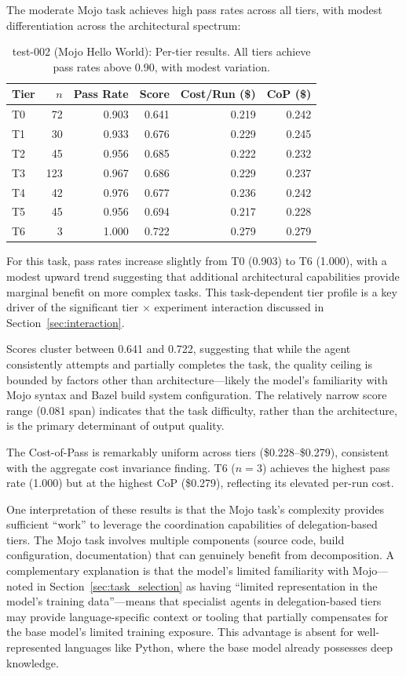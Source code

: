 \documentclass[11pt]{article}
\begin{document}
The moderate Mojo task achieves high pass rates across all tiers, with
modest differentiation across the architectural spectrum:

\begin{table}[htbp]
  \centering
  \caption{test-002 (Mojo Hello World): Per-tier results. All tiers achieve
    pass rates above 0.90, with modest variation.}
  \label{tab:test002}
  \small
  \begin{tabular}{lrrrrr}
    \toprule
    Tier & $n$ & Pass Rate & Score & Cost/Run (\$) & CoP (\$) \\
    \midrule
    T0 & 72  & 0.903 & 0.641 & 0.219 & 0.242 \\
    T1 & 30  & 0.933 & 0.676 & 0.229 & 0.245 \\
    T2 & 45  & 0.956 & 0.685 & 0.222 & 0.232 \\
    T3 & 123 & 0.967 & 0.686 & 0.229 & 0.237 \\
    T4 & 42  & 0.976 & 0.677 & 0.236 & 0.242 \\
    T5 & 45  & 0.956 & 0.694 & 0.217 & 0.228 \\
    T6 & 3   & 1.000 & 0.722 & 0.279 & 0.279 \\
    \bottomrule
  \end{tabular}
\end{table}

For this task, pass rates increase slightly from T0 (0.903) to T6 (1.000),
with a modest upward trend suggesting that additional architectural
capabilities provide marginal benefit on more complex tasks. This
task-dependent tier profile is a key driver of the significant tier $\times$
experiment interaction discussed in Section~\ref{sec:interaction}.

Scores cluster between 0.641 and 0.722, suggesting that while the agent
consistently attempts and partially completes the task, the quality ceiling is
bounded by factors other than architecture---likely the model's familiarity
with Mojo syntax and Bazel build system configuration. The relatively narrow
score range (0.081 span) indicates that the task difficulty, rather than the
architecture, is the primary determinant of output quality.

The Cost-of-Pass is remarkably uniform across tiers (\$0.228--\$0.279),
consistent with the aggregate cost invariance finding. T6 ($n=3$) achieves the
highest pass rate (1.000) but at the highest CoP (\$0.279), reflecting its
elevated per-run cost.

One interpretation of these results is that the Mojo task's complexity
provides sufficient ``work'' to leverage the coordination capabilities of
delegation-based tiers. The Mojo task involves multiple components (source
code, build configuration, documentation) that can genuinely benefit from
decomposition. A complementary explanation is that the model's limited
familiarity with Mojo---noted in Section~\ref{sec:task_selection} as having
``limited representation in the model's training data''---means that specialist
agents in delegation-based tiers may provide language-specific context or
tooling that partially compensates for the base model's limited training
exposure. This advantage is absent for well-represented languages like Python,
where the base model already possesses deep knowledge.
\end{document}
